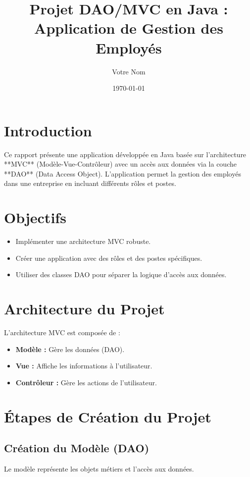 \documentclass[12pt,a4paper]{article}
\title{Projet DAO/MVC en Java : Application de Gestion des Employés}
\author{Votre Nom}
\date{\today}
\begin{document}
\maketitle

\tableofcontents

\newpage

\section{Introduction}
Ce rapport présente une application développée en Java basée sur l'architecture **MVC** (Modèle-Vue-Contrôleur) avec un accès aux données via la couche **DAO** (Data Access Object).  
L'application permet la gestion des employés dans une entreprise en incluant différents rôles et postes.

\section{Objectifs}
\begin{itemize}
    \item Implémenter une architecture MVC robuste.
    \item Créer une application avec des rôles et des postes spécifiques.
    \item Utiliser des classes DAO pour séparer la logique d'accès aux données.
\end{itemize}

\section{Architecture du Projet}
L'architecture MVC est composée de :  
\begin{itemize}
    \item \textbf{Modèle :} Gère les données (DAO).
    \item \textbf{Vue :} Affiche les informations à l'utilisateur.
    \item \textbf{Contrôleur :} Gère les actions de l'utilisateur.
\end{itemize}

\section{Étapes de Création du Projet}

\subsection{Création du Modèle (DAO)}
Le modèle représente les objets métiers et l'accès aux données.
\end{document}
